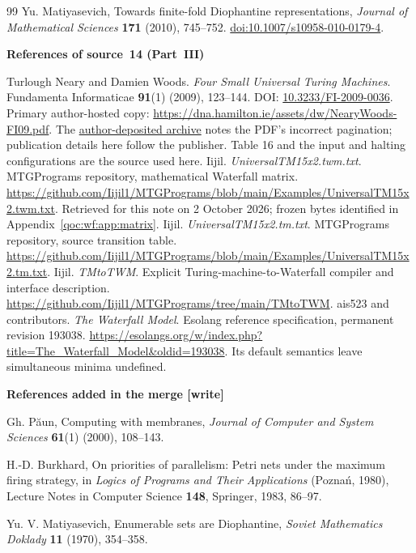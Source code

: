 \documentclass[11pt,letterpaper]{article}
\theoremstyle{definition}
\theoremstyle{remark}
\begin{document}
\begin{thebibliography}{99}
Yu. Matiyasevich, Towards finite-fold Diophantine representations,
\emph{Journal of Mathematical Sciences} \textbf{171} (2010), 745--752.
\href{https://doi.org/10.1007/s10958-010-0179-4}{doi:10.1007/s10958-010-0179-4}.
\item[]\textbf{References of source~14 (Part~III)}

 Turlough Neary and Damien Woods. \emph{Four Small Universal Turing Machines}. Fundamenta Informaticae \textbf{91}(1) (2009), 123--144. DOI: \href{https://doi.org/10.3233/FI-2009-0036}{10.3233/FI-2009-0036}. Primary author-hosted copy: \url{https://dna.hamilton.ie/assets/dw/NearyWoods-FI09.pdf}. The \href{https://mural.maynoothuniversity.ie/id/eprint/12416/}{author-deposited archive} notes the PDF's incorrect pagination; publication details here follow the publisher. Table 16 and the input and halting configurations are the source used here.
 Iijil. \emph{UniversalTM15x2.twm.txt}. MTGPrograms repository, mathematical Waterfall matrix. \url{https://github.com/Iijil1/MTGPrograms/blob/main/Examples/UniversalTM15x2.twm.txt}. Retrieved for this note on 2 October 2026; frozen bytes identified in Appendix~\ref{qoc:wf:app:matrix}.
 Iijil. \emph{UniversalTM15x2.tm.txt}. MTGPrograms repository, source transition table. \url{https://github.com/Iijil1/MTGPrograms/blob/main/Examples/UniversalTM15x2.tm.txt}.
 Iijil. \emph{TMtoTWM}. Explicit Turing-machine-to-Waterfall compiler and interface description. \url{https://github.com/Iijil1/MTGPrograms/tree/main/TMtoTWM}.
 ais523 and contributors. \emph{The Waterfall Model}. Esolang reference specification, permanent revision 193038. \url{https://esolangs.org/w/index.php?title=The_Waterfall_Model&oldid=193038}. Its default semantics leave simultaneous minima undefined.
\item[]\textbf{References added in the merge \textup{[write]}}

Gh. P\u{a}un, Computing with membranes, \emph{Journal of Computer and System Sciences} \textbf{61}(1) (2000), 108--143.

H.-D. Burkhard, On priorities of parallelism: Petri nets under the maximum firing strategy, in \emph{Logics of Programs and Their Applications} (Pozna\'n, 1980), Lecture Notes in Computer Science \textbf{148}, Springer, 1983, 86--97.

Yu. V. Matiyasevich, Enumerable sets are Diophantine, \emph{Soviet Mathematics Doklady} \textbf{11} (1970), 354--358.


\end{thebibliography}
\end{document}
